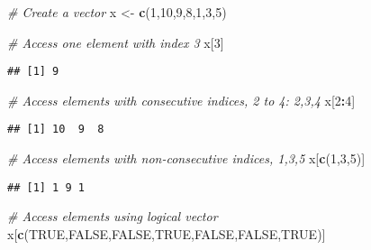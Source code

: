 \documentclass[
]{article}
\newenvironment{Shaded}{\begin{snugshade}}{\end{snugshade}}
\newcommand{\CommentTok}[1]{\textcolor[rgb]{0.56,0.35,0.01}{\textit{#1}}}
\newcommand{\ConstantTok}[1]{\textcolor[rgb]{0.56,0.35,0.01}{#1}}
\newcommand{\DecValTok}[1]{\textcolor[rgb]{0.00,0.00,0.81}{#1}}
\newcommand{\FunctionTok}[1]{\textcolor[rgb]{0.13,0.29,0.53}{\textbf{#1}}}
\newcommand{\NormalTok}[1]{#1}
\newcommand{\OtherTok}[1]{\textcolor[rgb]{0.56,0.35,0.01}{#1}}
\newcommand{\SpecialCharTok}[1]{\textcolor[rgb]{0.81,0.36,0.00}{\textbf{#1}}}
\begin{document}
\begin{Shaded}
\begin{Highlighting}[]
\CommentTok{\# Create a vector}
\NormalTok{x }\OtherTok{\textless{}{-}} \FunctionTok{c}\NormalTok{(}\DecValTok{1}\NormalTok{,}\DecValTok{10}\NormalTok{,}\DecValTok{9}\NormalTok{,}\DecValTok{8}\NormalTok{,}\DecValTok{1}\NormalTok{,}\DecValTok{3}\NormalTok{,}\DecValTok{5}\NormalTok{)}
\end{Highlighting}
\end{Shaded}

\begin{Shaded}
\begin{Highlighting}[]
\CommentTok{\# Access one element with index 3}
\NormalTok{x[}\DecValTok{3}\NormalTok{]}
\end{Highlighting}
\end{Shaded}

\begin{verbatim}
## [1] 9
\end{verbatim}

\begin{Shaded}
\begin{Highlighting}[]
\CommentTok{\# Access elements with consecutive indices, 2 to 4: 2,3,4}
\NormalTok{x[}\DecValTok{2}\SpecialCharTok{:}\DecValTok{4}\NormalTok{]}
\end{Highlighting}
\end{Shaded}

\begin{verbatim}
## [1] 10  9  8
\end{verbatim}

\begin{Shaded}
\begin{Highlighting}[]
\CommentTok{\# Access elements with non{-}consecutive indices, 1,3,5}
\NormalTok{x[}\FunctionTok{c}\NormalTok{(}\DecValTok{1}\NormalTok{,}\DecValTok{3}\NormalTok{,}\DecValTok{5}\NormalTok{)]}
\end{Highlighting}
\end{Shaded}

\begin{verbatim}
## [1] 1 9 1
\end{verbatim}

\begin{Shaded}
\begin{Highlighting}[]
\CommentTok{\# Access elements using logical vector}
\NormalTok{x[}\FunctionTok{c}\NormalTok{(}\ConstantTok{TRUE}\NormalTok{,}\ConstantTok{FALSE}\NormalTok{,}\ConstantTok{FALSE}\NormalTok{,}\ConstantTok{TRUE}\NormalTok{,}\ConstantTok{FALSE}\NormalTok{,}\ConstantTok{FALSE}\NormalTok{,}\ConstantTok{TRUE}\NormalTok{)]}
\end{Highlighting}
\end{Shaded}
\end{document}

